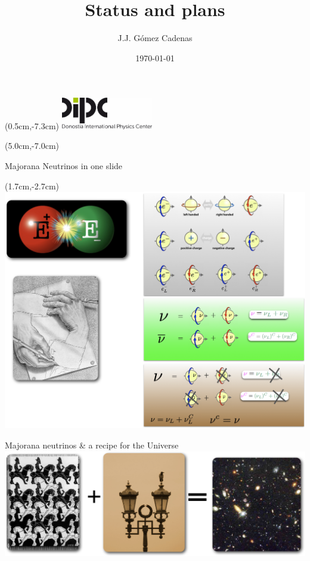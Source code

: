 \documentclass [aspectratio=169]{beamer}
\title[]{\vspace{60pt} \\
Status and plans} %
\author[]{J.J. Gómez Cadenas}
\institute[]{Donostia International Physics Center}
\date{\today}
\begin{document}
{
\begin{frame}
    \titlepage
    \begin{textblock*}{4cm}(0.5cm,-7.3cm)
        \includegraphics[width=4cm]{dipc.png}
    \end{textblock*}
    \begin{textblock*}{8cm}(5.0cm,-7.0cm)
        \huge {} %
    \end{textblock*}
\end{frame}
}

\begin{frame}{Majorana Neutrinos in one slide}
 \begin{textblock*}{4cm}(1.7cm,-2.7cm)
\includegraphics[scale=0.30]{majorananu.png}
 \end{textblock*}

\end{frame}


\begin{frame}{Majorana neutrinos \& a recipe for the Universe}
\includegraphics[scale=0.40]{Universe.png}
\end{frame}
\end{document}
